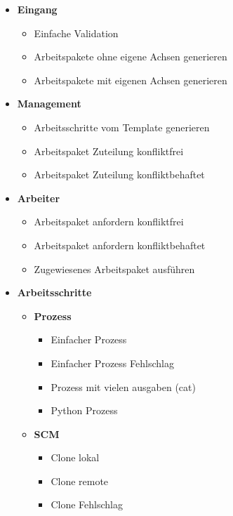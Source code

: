 \begin{itemize}
    \item
        \textbf{Eingang}
        \begin{itemize}
            \item Einfache Validation
            \item Arbeitspakete ohne eigene Achsen generieren
            \item Arbeitspakete mit eigenen Achsen generieren
        \end{itemize}
    \item
        \textbf{Management}
        \begin{itemize}
            \item Arbeitsschritte vom Template generieren
            \item Arbeitspaket Zuteilung konfliktfrei
            \item Arbeitspaket Zuteilung konfliktbehaftet
        \end{itemize}
    \item
        \textbf{Arbeiter}
        \begin{itemize}
            \item Arbeitspaket anfordern konfliktfrei
            \item Arbeitspaket anfordern konfliktbehaftet
            \item Zugewiesenes Arbeitspaket ausführen
        \end{itemize}
    \item
        \textbf{Arbeitsschritte}
        \begin{itemize}
            \item
                \textbf{Prozess}
                \begin{itemize}
                    \item Einfacher Prozess
                    \item Einfacher Prozess Fehlschlag
                    \item Prozess mit vielen ausgaben (cat)
                    \item Python Prozess
                \end{itemize}
            \item
                \textbf{SCM}
                \begin{itemize}
                    \item Clone lokal
                    \item Clone remote
                    \item Clone Fehlschlag
                \end{itemize}
        \end{itemize}
\end{itemize}



